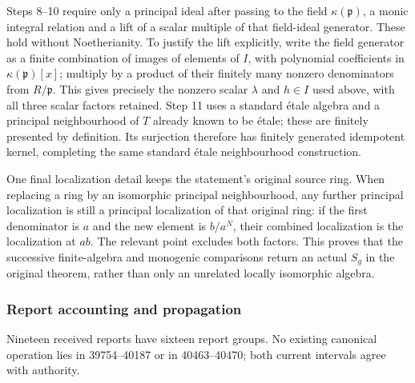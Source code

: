 Steps 8--10 require only a principal ideal after passing to the field \(\kappa(\mathfrak p)\), a monic integral relation and a lift of a scalar multiple of that field-ideal generator. These hold without Noetherianity. To justify the lift explicitly, write the field generator as a finite combination of images of elements of \(I\), with polynomial coefficients in \(\kappa(\mathfrak p)[x]\); multiply by a product of their finitely many nonzero denominators from \(R/\mathfrak p\). This gives precisely the nonzero scalar \(\lambda\) and \(h\in I\) used above, with all three scalar factors retained. Step 11 uses a standard étale algebra and a principal neighbourhood of \(T\) already known to be étale; these are finitely presented by definition. Its surjection therefore has finitely generated idempotent kernel, completing the same standard étale neighbourhood construction.

One final localization detail keeps the statement's original source ring. When replacing a ring by an isomorphic principal neighbourhood, any further principal localization is still a principal localization of that original ring: if the first denominator is \(a\) and the new element is \(b/a^N\), their combined localization is the localization at \(ab\). The relevant point excludes both factors. This proves that the successive finite-algebra and monogenic comparisons return an actual \(S_g\) in the original theorem, rather than only an unrelated locally isomorphic algebra.

\subsubsection{Report accounting and propagation}\label{algebra-proof-052-report-accounting-and-propagation}

Nineteen received reports have sixteen report groups. No existing canonical operation lies in 39754--40187 or in 40463--40470; both current intervals agree with authority.

